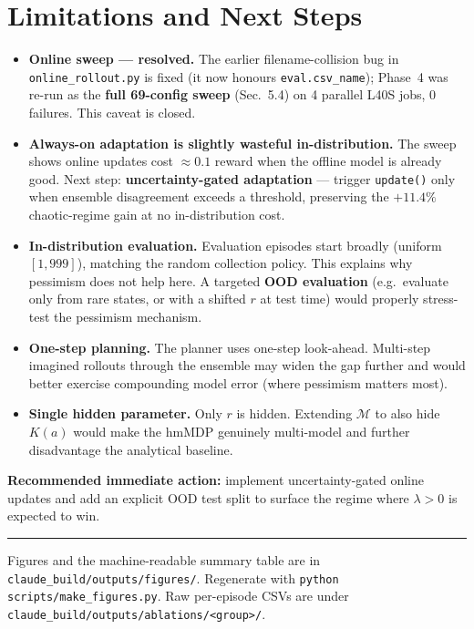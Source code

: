 \documentclass[11pt]{article}
\begin{document}
\section{Limitations and Next Steps}

\begin{itemize}
  \item \textbf{Online sweep --- resolved.} The earlier filename-collision
        bug in \texttt{online\_rollout.py} is fixed (it now honours
        \texttt{eval.csv\_name}); Phase~4 was re-run as the \textbf{full
        69-config sweep} (Sec.~5.4) on 4 parallel L40S jobs, 0 failures.
        This caveat is closed.
  \item \textbf{Always-on adaptation is slightly wasteful in-distribution.}
        The sweep shows online updates cost ${\approx}0.1$ reward when the
        offline model is already good. Next step: \textbf{uncertainty-gated
        adaptation} --- trigger \texttt{update()} only when ensemble
        disagreement exceeds a threshold, preserving the $+11.4\%$
        chaotic-regime gain at no in-distribution cost.
  \item \textbf{In-distribution evaluation.} Evaluation episodes start
        broadly (uniform $[1,999]$), matching the random collection policy.
        This explains why pessimism does not help here. A targeted
        \textbf{OOD evaluation} (e.g.\ evaluate only from rare states, or
        with a shifted $r$ at test time) would properly stress-test the
        pessimism mechanism.
  \item \textbf{One-step planning.} The planner uses one-step look-ahead.
        Multi-step imagined rollouts through the ensemble may widen the gap
        further and would better exercise compounding model error (where
        pessimism matters most).
  \item \textbf{Single hidden parameter.} Only $r$ is hidden. Extending
        $\mathcal{M}$ to also hide $K(a)$ would make the hmMDP genuinely
        multi-model and further disadvantage the analytical baseline.
\end{itemize}

\textbf{Recommended immediate action:} implement uncertainty-gated online
updates and add an explicit OOD test split to surface the regime where
$\lambda>0$ is expected to win.

\vspace{1em}
\hrule
\vspace{0.5em}
{\small Figures and the machine-readable summary table are in
\texttt{claude\_build/outputs/figures/}. Regenerate with
\texttt{python scripts/make\_figures.py}. Raw per-episode CSVs are under
\texttt{claude\_build/outputs/ablations/<group>/}.}
\end{document}
